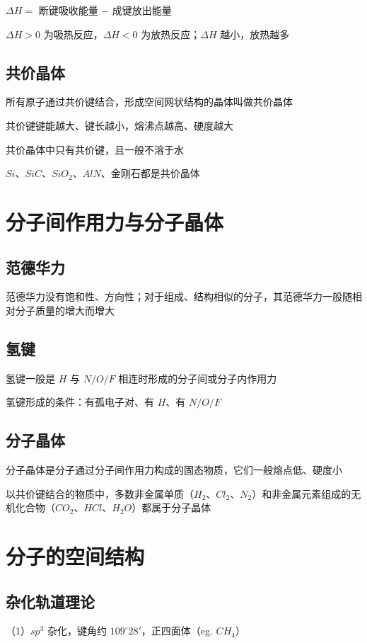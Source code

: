 \documentclass[UTF8,zihao=-4,openany]{ctexbook}
\begin{document}
$\Delta H=$ 断键吸收能量 $-$ 成键放出能量\par

$\Delta H>0$ 为吸热反应，$\Delta H<0$ 为放热反应；$\Delta H$ 越小，放热越多\par
\subsection{共价晶体}
所有原子通过共价键结合，形成空间网状结构的晶体叫做共价晶体\par

共价键键能越大、键长越小，熔沸点越高、硬度越大\par

共价晶体中只有共价键，且一般不溶于水\par

$Si$、$SiC$、$SiO_2$、$AlN$、金刚石都是共价晶体\par
\section{分子间作用力与分子晶体}
\subsection{范德华力}
范德华力没有饱和性、方向性；对于组成、结构相似的分子，其范德华力一般随相对分子质量的增大而增大\par
\subsection{氢键}
氢键一般是 $H$ 与 $N/O/F$ 相连时形成的分子间或分子内作用力\par

氢键形成的条件：有孤电子对、有 $H$、有 $N/O/F$\par
\subsection{分子晶体}
分子晶体是分子通过分子间作用力构成的固态物质，它们一般熔点低、硬度小\par

以共价键结合的物质中，多数非金属单质（$H_2$、$Cl_2$、$N_2$）和非金属元素组成的无机化合物（$CO_2$、$HCl$、$H_2O$）都属于分子晶体\par
\section{分子的空间结构}
\subsection{杂化轨道理论}
（1）$sp^3$ 杂化，键角约 $109^{\circ}28'$，正四面体（eg. $CH_4$）\par
\end{document}
